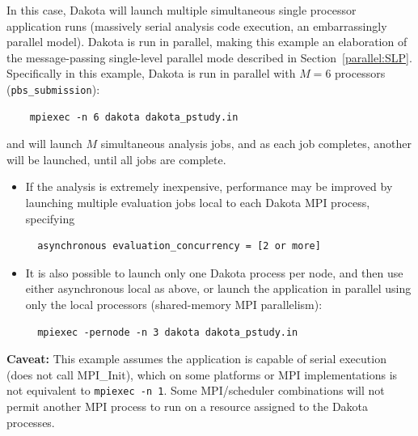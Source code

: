 In this case, Dakota will launch multiple simultaneous single
processor application runs (massively serial analysis code execution,
an embarrassingly parallel model).  Dakota is run in parallel, making
this example an elaboration of the message-passing single-level
parallel mode described in Section~\ref{parallel:SLP}.  Specifically
in this example, Dakota is run in parallel with $M=6$ processors
({\tt pbs\_submission}):
\begin{verbatim}
    mpiexec -n 6 dakota dakota_pstudy.in
\end{verbatim}
and will launch $M$ simultaneous analysis jobs, and as each job 
completes, another will be launched, until all jobs are complete.
\begin{itemize}


\item If the analysis is extremely inexpensive, performance may be
improved by launching multiple evaluation jobs local to each Dakota
MPI process, specifying
\begin{verbatim}
  asynchronous evaluation_concurrency = [2 or more]
\end{verbatim}

\item It is also possible to launch only one Dakota process per node,
and then use either asynchronous local as above, or launch the
application in parallel using only the local processors (shared-memory
MPI parallelism):

\begin{verbatim}
  mpiexec -pernode -n 3 dakota dakota_pstudy.in
\end{verbatim}

\end{itemize}

{\bf Caveat:} This example assumes the application is capable of
serial execution (does not call MPI\_Init), which on some platforms or
MPI implementations is not equivalent to {\tt mpiexec -n 1}.  Some
MPI/scheduler combinations will not permit another MPI process to run
on a resource assigned to the Dakota processes.

